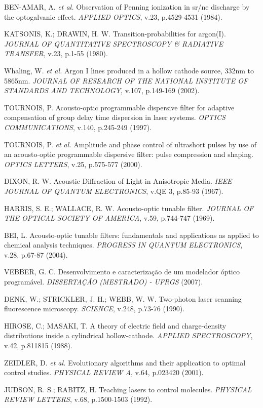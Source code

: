 \begin{thebibliography}{99}
 BEN-AMAR, A. {\it et al.} Observation of Penning ionization in sr/ne discharge by the optogalvanic effect. {\it APPLIED OPTICS}, v.23, p.4529-4531 (1984).

 KATSONIS, K.; DRAWIN, H. W. Transition-probabilities for argon(I). {\it JOURNAL OF QUANTITATIVE SPECTROSCOPY \& RADIATIVE TRANSFER}, v.23, p.1-55 (1980).

 Whaling, W. {\it et al.} Argon I lines produced in a hollow cathode source, 332nm to 5865nm. {\it JOURNAL OF RESEARCH OF THE NATIONAL INSTITUTE OF STANDARDS AND TECHNOLOGY}, v.107, p.149-169 (2002).

 TOURNOIS, P. Acousto-optic programmable dispersive filter for adaptive compensation of group delay time dispersion in laser systems. {\it OPTICS COMMUNICATIONS}, v.140, p.245-249 (1997).

 TOURNOIS, P. {\it et al.} Amplitude and phase control of ultrashort pulses by use of an acousto-optic programmable dispersive filter: pulse compression and shaping. {\it OPTICS LETTERS}, v.25, p.575-577 (2000).

 DIXON, R. W. Acoustic Diffraction of Light in Anisotropic Media. {\it IEEE JOURNAL OF QUANTUM ELECTRONICS}, v.QE 3, p.85-93 (1967).

  HARRIS, S. E.; WALLACE, R. W. Acousto-optic tunable filter. {\it JOURNAL OF THE OPTICAL SOCIETY OF AMERICA}, v.59, p.744-747 (1969).

 BEI, L.  Acousto-optic tunable filters: fundamentals and applications as applied to chemical analysis techniques. {\it PROGRESS IN QUANTUM ELECTRONICS}, v.28, p.67-87 (2004).

 VEBBER, G. C. Desenvolvimento e caracterização de um modelador óptico programável. {\it DISSERTAÇÃO (MESTRADO) - UFRGS} (2007).

 DENK, W.; STRICKLER, J. H.; WEBB, W. W. Two-photon laser scanning fluorescence microscopy. {\it SCIENCE}, v.248, p.73-76 (1990).

 HIROSE, C.; MASAKI, T. A theory of electric field and charge-density distributions inside a cylindrical hollow-cathode. {\it APPLIED SPECTROSCOPY}, v.42, p.811815 (1988).

 ZEIDLER, D. {\it et al.} Evolutionary algorithms and their application to optimal control studies. {\it PHYSICAL REVIEW A}, v.64, p.023420 (2001).

 JUDSON, R. S.; RABITZ, H. Teaching lasers to control molecules. {\it PHYSICAL REVIEW LETTERS}, v.68, p.1500-1503 (1992).

\end{thebibliography}





